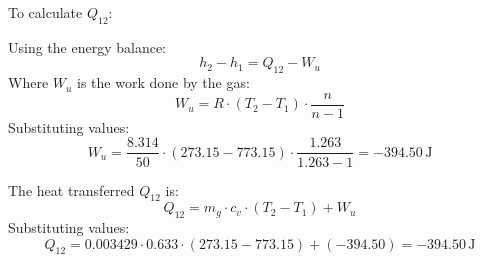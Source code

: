 To calculate \( Q_{12} \):  

Using the energy balance:  
\[
h_2 - h_1 = Q_{12} - W_u
\]  
Where \( W_u \) is the work done by the gas:  
\[
W_u = R \cdot (T_2 - T_1) \cdot \frac{n}{n-1}
\]  
Substituting values:  
\[
W_u = \frac{8.314}{50} \cdot (273.15 - 773.15) \cdot \frac{1.263}{1.263 - 1} = -394.50 \, \text{J}
\]  

The heat transferred \( Q_{12} \) is:  
\[
Q_{12} = m_g \cdot c_v \cdot (T_2 - T_1) + W_u
\]  
Substituting values:  
\[
Q_{12} = 0.003429 \cdot 0.633 \cdot (273.15 - 773.15) + (-394.50) = -394.50 \, \text{J}
\]